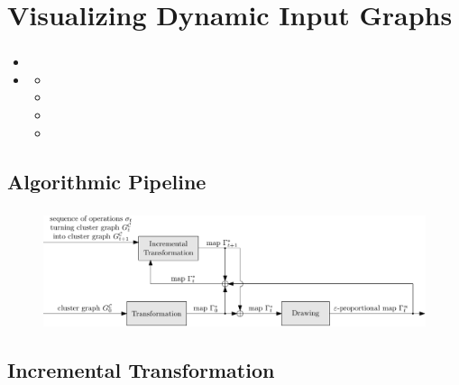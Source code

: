 \documentclass[t,18pt]{beamer}
\begin{document}
\section{Visualizing Dynamic Input Graphs}
\label{sect:visualizing-dynamic-input-graphs}

\begin{frame}
  \frametitle{}
  \begin{itemize}
    \item {}
    \item {} \begin{itemize}
      \item {}
      \item {}
      \item {}
      \item {}
    \end{itemize}
  \end{itemize}
\end{frame}

\subsection{Algorithmic Pipeline}
\label{subsect:algorithmic-pipeline-dynamic}

\begin{frame}[c]
  \frametitle{}
  \begin{figure}
    \includegraphics[width=\textwidth]{../Thesis/Resources/Framework-3.pdf}
  \end{figure}
\end{frame}

\subsection{Incremental Transformation}
\label{subsect:incremental-transformation}
\end{document}
